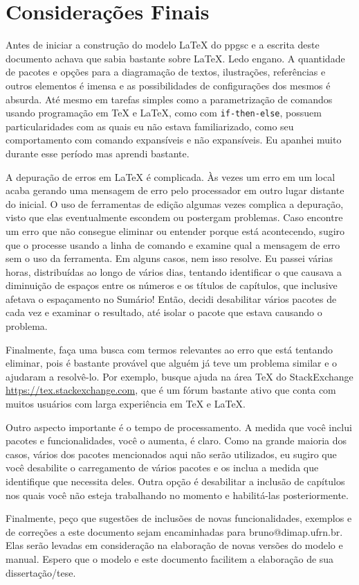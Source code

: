 \chapter{Considerações Finais}\label{cap:ConsideracoesFinais}

Antes de iniciar a construção do modelo \LaTeX{} do \gls{ppgsc} e a escrita deste documento achava que sabia bastante sobre \LaTeX{}. Ledo engano. A quantidade de pacotes e opções para a diagramação de textos, ilustrações, referências e outros elementos é imensa e as possibilidades de configurações dos mesmos é absurda. Até mesmo em tarefas simples como a parametrização de comandos usando programação em \TeX{} e \LaTeX{}, como com \texttt{if-then-else}, possuem particularidades com as quais eu não estava familiarizado, como seu comportamento com comando expansíveis e não expansíveis. Eu apanhei muito durante esse período mas aprendi bastante.

A depuração de erros em \LaTeX{} é complicada. Às vezes um erro em um local acaba gerando uma mensagem de erro pelo processador em outro lugar distante do inicial. O uso de ferramentas de edição algumas vezes complica a depuração, visto que elas eventualmente escondem ou postergam problemas. Caso encontre um erro que não consegue eliminar ou entender porque está acontecendo, sugiro que o processe usando a linha de comando e examine qual a mensagem de erro sem o uso da ferramenta. Em alguns casos, nem isso resolve. Eu passei várias horas, distribuídas ao longo de vários dias, tentando identificar o que causava a diminuição de espaços entre os números e os títulos de capítulos, que inclusive afetava o espaçamento no Sumário! Então, decidi desabilitar vários pacotes de cada vez e examinar o resultado, até isolar o pacote que estava causando o problema.

Finalmente, faça uma busca com termos relevantes ao erro que está tentando eliminar, pois é bastante provável que alguém já teve um problema similar e o ajudaram a resolvê-lo. Por exemplo, busque ajuda na área \TeX{} do StackExchange \url{https://tex.stackexchange.com}, que é um fórum bastante ativo que conta com muitos usuários com larga experiência em \TeX{} e \LaTeX{}.

Outro aspecto importante é o tempo de processamento. A medida que você inclui pacotes e funcionalidades, você o aumenta, é claro. Como na grande maioria dos casos, vários dos pacotes mencionados aqui não serão utilizados, eu sugiro que você desabilite o carregamento de vários pacotes e os inclua a medida que identifique que necessita deles. Outra opção é desabilitar a inclusão de capítulos nos quais você não esteja trabalhando no momento e habilitá-las posteriormente.

Finalmente, peço que sugestões de inclusões de novas funcionalidades, exemplos e de correções a este documento sejam encaminhadas para bruno@dimap.ufrn.br. Elas serão levadas em consideração na elaboração de novas versões do modelo e manual. Espero que o modelo e este documento facilitem a elaboração de sua dissertação/tese. 
